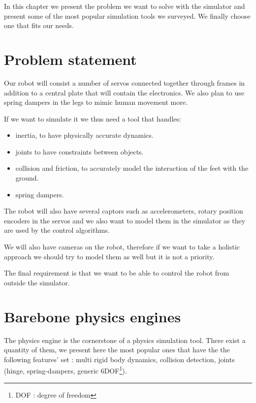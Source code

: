 In this chapter we present the problem we want to solve with the simulator and present some of the most popular simulation tools we surveyed. We finally choose one that fits our needs.

\section{Problem statement}
Our robot will consist a number of servos connected together through frames in addition to a central plate that will contain the electronics. We also plan to use spring dampers in the legs to mimic human movement more.

If we want to simulate it we thus need a tool that handles:\begin{itemize}
\item inertia, to have physically accurate dynamics.
\item joints to have constraints between objects.
\item collision and friction, to accurately model the interaction of the feet with the ground.
\item spring dampers.
\end{itemize}

The robot will also have several captors such as accelerometers, rotary position encoders in the servos and we also want to model them in the simulator as they are used by the control algorithms.

We will also have cameras on the robot, therefore if we want to take a holistic approach we should try to model them as well but it is not a priority. 

The final requirement is that we want to be able to control the robot from outside the simulator.

\section{Barebone physics engines}
The physics engine is the cornerstone of a physics simulation tool. There exist a quantity of them, we present here the most popular ones that have the the following features' set :  multi rigid body dynamics, collision detection, joints (hinge, spring-dampers, generic 6DOF\footnote{DOF : degree of freedom}). 

